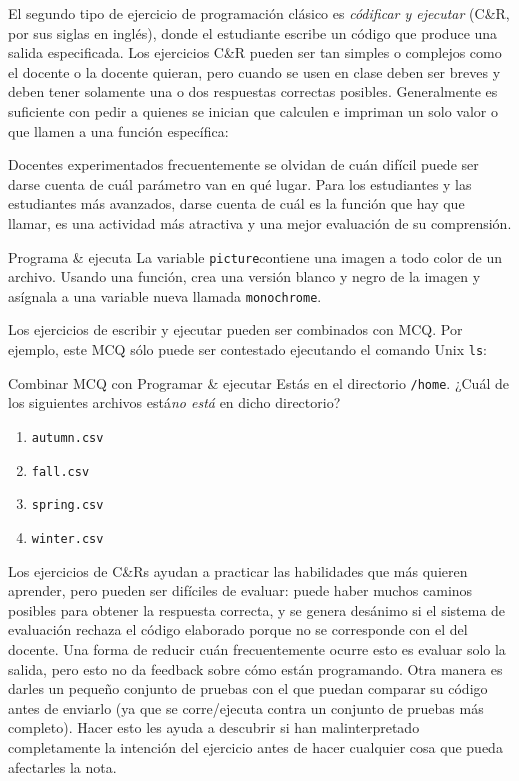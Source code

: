 El segundo tipo de ejercicio de programación clásico es \emph{códificar y ejecutar} (C\&R, por sus siglas en inglés),
donde el estudiante escribe un código que produce una salida especificada. 
Los ejercicios C\&R pueden ser tan simples o complejos como el docente o la docente quieran, pero cuando se usen en clase deben ser breves y deben tener solamente una o dos respuestas correctas posibles.
Generalmente es suficiente con pedir a quienes se inician que calculen e impriman un solo valor o que llamen a una función específica:

Docentes experimentados frecuentemente se olvidan de cuán difícil puede ser darse cuenta de cuál parámetro van en qué lugar.
Para los estudiantes y las estudiantes  más avanzados, darse cuenta de cuál es la función que hay que llamar, es una actividad más atractiva y una mejor evaluación de su comprensión.

\begin{aside}{Programa \& ejecuta}
La variable \texttt{picture}contiene una imagen a todo color de un archivo.
Usando una función,
crea una versión blanco y negro de la imagen
y asígnala a una variable nueva llamada \texttt{monochrome}.
\end{aside}

Los ejercicios de escribir y ejecutar pueden ser combinados con MCQ.
Por ejemplo,
este MCQ sólo puede ser contestado ejecutando el comando Unix \texttt{ls}:

\begin{aside}{Combinar MCQ con Programar \& ejecutar}
  Estás en el directorio  \texttt{/home}.
  ¿Cuál de los siguientes archivos está\emph{no está} en dicho directorio?
  \begin{enumerate}
  \item
    \texttt{autumn.csv}
  \item
    \texttt{fall.csv}
  \item
    \texttt{spring.csv}
  \item
    \texttt{winter.csv}
  \end{enumerate}
\end{aside}

Los ejercicios de C\&Rs ayudan a practicar las habilidades que más quieren aprender,
pero pueden ser  difíciles de evaluar:
puede haber muchos caminos posibles para obtener la respuesta correcta,
y se genera desánimo si el sistema de evaluación rechaza el código elaborado porque no se corresponde con el del docente.
Una forma de reducir cuán frecuentemente ocurre esto es evaluar solo la salida,
pero esto no da feedback sobre cómo están programando.
Otra manera es darles un pequeño conjunto de pruebas con el que puedan comparar su código antes de enviarlo
(ya que se corre/ejecuta contra un conjunto de pruebas más completo).
Hacer esto les ayuda a descubrir si han malinterpretado completamente la intención del ejercicio antes de hacer cualquier cosa que pueda afectarles la nota.

